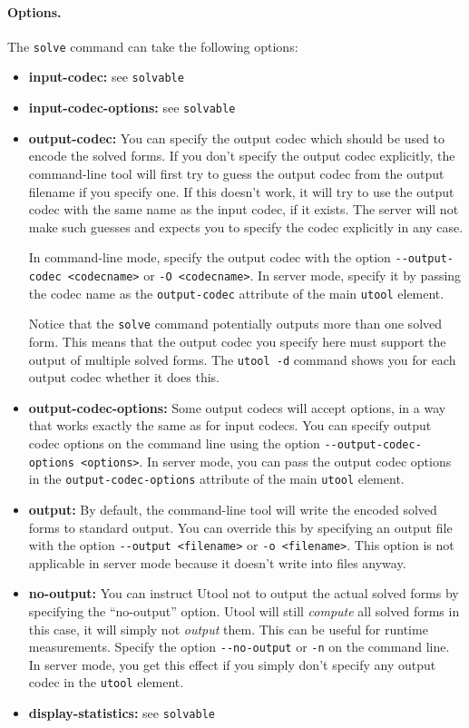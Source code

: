 \paragraph{Options.}
The \verb?solve? command can take the following options:
\begin{itemize}
\item \textbf{input-codec:} see \verb?solvable?
\item \textbf{input-codec-options:} see \verb?solvable?
\item \textbf{output-codec:} You can specify the output codec which
should be used to encode the solved forms. If you don't specify the
output codec explicitly, the command-line tool will first try to guess
the output codec from the output filename if you specify one. If this
doesn't work, it will try to use the output codec with the same name
as the input codec, if it exists. The server will not make such
guesses and expects you to specify the codec explicitly in any case.

In command-line mode, specify the output codec with the option
\verb?--output-codec <codecname>? or \verb?-O <codecname>?. In server
mode, specify it by passing the codec name as the \verb?output-codec?
attribute of the main \verb?utool? element.

Notice that the \verb?solve? command potentially outputs more than one solved form. This means that the output codec you specify here must support the output of multiple solved forms. The \verb?utool -d? command shows you for each output codec whether it does this.

\item \textbf{output-codec-options:} Some output codecs will accept options, in a way that works exactly the same as for input codecs. You can specify output codec options on the command line using the option \verb?--output-codec-options <options>?. In server mode, you can pass the output codec options in the \verb?output-codec-options? attribute of the main \verb?utool? element.

\item \textbf{output:} By default, the command-line tool will write
the encoded solved forms to standard output. You can override this by
specifying an output file with the option \verb?--output <filename>?
or \verb?-o <filename>?. This option is not applicable in server mode
because it doesn't write into files anyway.

\item \textbf{no-output:} You can instruct Utool not to output the
actual solved forms by specifying the ``no-output'' option. Utool will
still \emph{compute} all solved forms in this case, it will simply not
\emph{output} them. This can be useful for runtime
measurements. Specify the option \verb?--no-output? or \verb?-n? on
the command line. In server mode, you get this effect if you simply
don't specify any output codec in the \verb?utool? element.

\item \textbf{display-statistics:} see \verb?solvable? 
\end{itemize}






